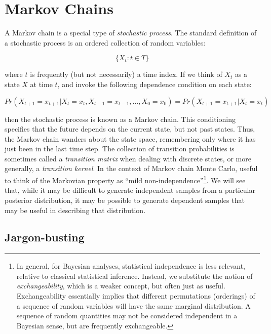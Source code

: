 
\hypertarget{markov-chains}{}
\section*{Markov Chains}

A Markov chain is a special type of \emph{stochastic process}. The standard definition of a stochastic process is an ordered collection of random variables:

\[
\{X_t:t \in T\}
\]

\noindent where $t$ is frequently (but not necessarily) a time index. If we think of $X_t$ as a state $X$ at time $t$, and invoke the following dependence condition on each state:

\[
Pr(X_{t+1}=x_{t+1} | X_t=x_t, X_{t-1}=x_{t-1},\ldots,X_0=x_0) = Pr(X_{t+1}=x_{t+1} | X_t=x_t)
\]

\noindent then the stochastic process is known as a Markov chain. This conditioning specifies that the future depends on the current state, but not past states. Thus, the Markov chain wanders about the state space, remembering only where it has just been in the last time step. The collection of transition probabilities is sometimes called a \emph{transition matrix} when dealing with discrete states, or more generally, a \emph{transition kernel}. In the context of Markov chain Monte Carlo, useful to think of the Markovian property as ``mild non-independence''\footnote{In general, for Bayesian analyses, statistical independence is less relevant, relative to classical statistical inference. Instead, we substitute the notion of \emph{exchangeability}, which is a weaker concept, but often just as useful. Exchangeability essentially implies that different permutations (orderings) of a sequence of random variables will have the same marginal distribution. A sequence of random quantities may not be considered independent in a Bayesian sense, but are frequently exchangeable.}. We will see that, while it may be difficult to generate independent samples from a particular posterior distribution, it may be possible to generate dependent samples that may be useful in describing that distribution.


\hypertarget{jargon-busting}{}
\subsection*{Jargon-busting}

